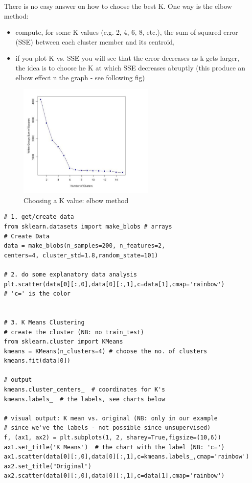 \documentclass[11pt]{article}
\begin{document}
There is no easy answer on how to choose the best K. One way is the  elbow method:
\begin{itemize}
	\item compute, for some K values (e.g. 2, 4, 6, 8, etc.), the sum of squared error (SSE) between each cluster member and its centroid,
	\item if you plot K vs. SSE you will see that the error decreases as k gets larger, the idea is to choose he K at which SSE decreases abruptly (this produce an elbow effect n the graph - see following fig) 
\end{itemize} 
\begin{figure}[htbp] 
	\centering
	\includegraphics[width=0.6\textwidth]{pics/elbow}
	\caption{Choosing a K value: elbow method} 
\end{figure}

\begin{lstlisting}
# 1. get/create data
from sklearn.datasets import make_blobs # arrays
# Create Data
data = make_blobs(n_samples=200, n_features=2, 
centers=4, cluster_std=1.8,random_state=101)

# 2. do some explanatory data analysis
plt.scatter(data[0][:,0],data[0][:,1],c=data[1],cmap='rainbow')
# 'c=' is the color


# 3. K Means Clustering
# create the cluster (NB: no train_test) 
from sklearn.cluster import KMeans
kmeans = KMeans(n_clusters=4) # choose the no. of clusters
kmeans.fit(data[0])

# output
kmeans.cluster_centers_  # coordinates for K's
kmeans.labels_  # the labels, see charts below

# visual output: K mean vs. original (NB: only in our example 
# since we've the labels - not possible since unsupervised)
f, (ax1, ax2) = plt.subplots(1, 2, sharey=True,figsize=(10,6))
ax1.set_title('K Means')  # the chart with the label (NB: 'c=')
ax1.scatter(data[0][:,0],data[0][:,1],c=kmeans.labels_,cmap='rainbow')
ax2.set_title("Original")
ax2.scatter(data[0][:,0],data[0][:,1],c=data[1],cmap='rainbow')
\end{lstlisting}
\end{document}
